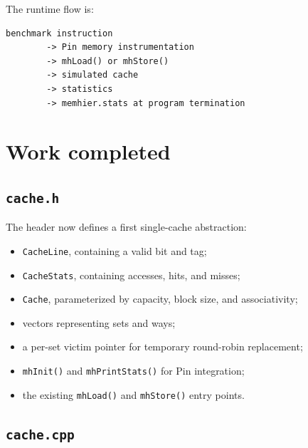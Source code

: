 \documentclass[11pt]{article}
\begin{document}
The runtime flow is:
\begin{verbatim}
benchmark instruction
        -> Pin memory instrumentation
        -> mhLoad() or mhStore()
        -> simulated cache
        -> statistics
        -> memhier.stats at program termination
\end{verbatim}

\section{Work completed}

\subsection{\texttt{cache.h}}

The header now defines a first single-cache abstraction:
\begin{itemize}[leftmargin=*]
  \item \texttt{CacheLine}, containing a valid bit and tag;
  \item \texttt{CacheStats}, containing accesses, hits, and misses;
  \item \texttt{Cache}, parameterized by capacity, block size, and
        associativity;
  \item vectors representing sets and ways;
  \item a per-set victim pointer for temporary round-robin replacement;
  \item \texttt{mhInit()} and \texttt{mhPrintStats()} for Pin integration;
  \item the existing \texttt{mhLoad()} and \texttt{mhStore()} entry points.
\end{itemize}

\subsection{\texttt{cache.cpp}}
\end{document}
